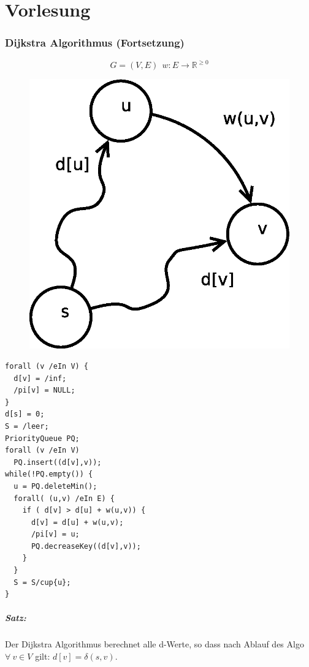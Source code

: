 \chapter{Vorlesung}
\subsection*{Dijkstra Algorithmus (Fortsetzung)}
\[ G=(V,E)~~ w:E\rightarrow \mathbb{R}^{\geq0} \]
\begin{figure}
	\centering
	\includegraphics[width=\linewidth]{17/Grafik/Skizze}
	\caption{}
	\label{fig:Skizze}
\end{figure}
\begin{lstlisting}
forall (v /eIn V) {
  d[v] = /inf;
  /pi[v] = NULL;
}
d[s] = 0;
S = /leer;
PriorityQueue PQ;
forall (v /eIn V)
  PQ.insert((d[v],v));
while(!PQ.empty()) {
  u = PQ.deleteMin();
  forall( (u,v) /eIn E) {
    if ( d[v] > d[u] + w(u,v)) {
      d[v] = d[u] + w(u,v);
      /pi[v] = u;
      PQ.decreaseKey((d[v],v));
    }
  }
  S = S/cup{u};
}
\end{lstlisting}

\paragraph{Satz:}
Der Dijkstra Algorithmus berechnet alle d-Werte, so dass nach Ablauf des Algo $\forall~v\in V$ gilt: $d[v] = \delta(s,v)$.
\pagebreak
